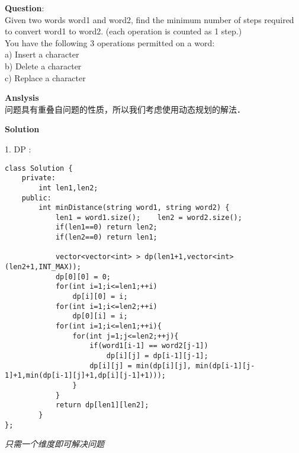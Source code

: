     
\begin{description}
    \item{\textbf{Question}}:\\%
		Given two words word1 and word2, find the minimum number of steps required to convert word1 to word2. (each operation is counted as 1 step.)\\
		You have the following 3 operations permitted on a word:\\
		a) Insert a character\\
		b) Delete a character\\
		c) Replace a character\\

    \item{\textbf{Anslysis}}\\
		问题具有重叠自问题的性质，所以我们考虑使用动态规划的解法．

    \item{\textbf{Solution}}\\
	\item{1. DP} : \\
    \begin{lstlisting}
class Solution {
	private:
		int len1,len2;
	public:
		int minDistance(string word1, string word2) {
			len1 = word1.size();	len2 = word2.size();
			if(len1==0)	return len2;
			if(len2==0)	return len1;

			vector<vector<int> > dp(len1+1,vector<int>(len2+1,INT_MAX));
			dp[0][0] = 0;
			for(int i=1;i<=len1;++i)
				dp[i][0] = i;
			for(int i=1;i<=len2;++i)
				dp[0][i] = i;
			for(int i=1;i<=len1;++i){
				for(int j=1;j<=len2;++j){
					if(word1[i-1] == word2[j-1])
						dp[i][j] = dp[i-1][j-1];
					dp[i][j] = min(dp[i][j], min(dp[i-1][j-1]+1,min(dp[i-1][j]+1,dp[i][j-1]+1)));
				}
			}
			return dp[len1][len2];
		}
};    \end{lstlisting}
	\textit{只需一个维度即可解决问题}
\end{description}

